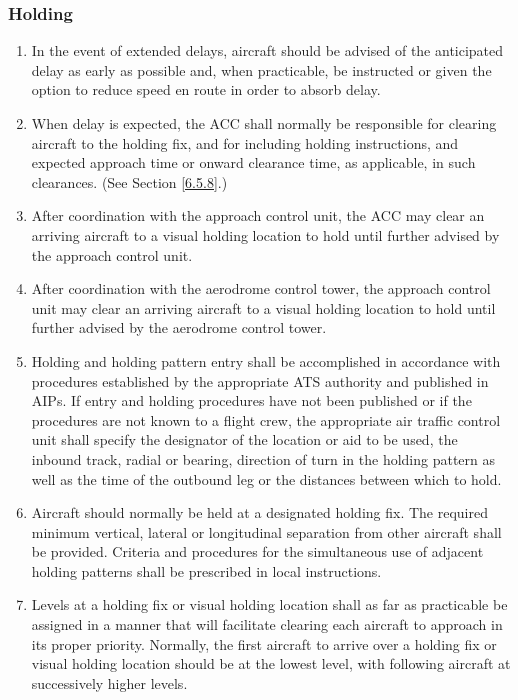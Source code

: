 \documentclass[../vATM.tex]{subfiles}
\begin{document}
    \subsubsection{Holding}

    \begin{enumerate}
        \item In the event of extended delays, aircraft should be advised of the anticipated delay as early as possible and, when practicable, be instructed or given the option to reduce speed en route in order to absorb delay.
        \item When delay is expected, the ACC shall normally be responsible for clearing aircraft to the holding fix, and for including holding instructions, and expected approach time or onward clearance time, as applicable, in such clearances. (See Section \ref{6.5.8}.)
        \item After coordination with the approach control unit, the ACC may clear an arriving aircraft to a visual holding location to hold until further advised by the approach control unit.
        \item After coordination with the aerodrome control tower, the approach control unit may clear an arriving aircraft to a visual holding location to hold until further advised by the aerodrome control tower.
        \item Holding and holding pattern entry shall be accomplished in accordance with procedures established by the appropriate ATS authority and published in AIPs. If entry and holding procedures have not been published or if the procedures are not known to a flight crew, the appropriate air traffic control unit shall specify the designator of the location or aid to be used, the inbound track, radial or bearing, direction of turn in the holding pattern as well as the time of the outbound leg or the distances between which to hold.
        \item Aircraft should normally be held at a designated holding fix. The required minimum vertical, lateral or longitudinal separation from other aircraft shall be provided. Criteria and procedures for the simultaneous use of adjacent holding patterns shall be prescribed in local instructions.
        \item Levels at a holding fix or visual holding location shall as far as practicable be assigned in a manner that will facilitate clearing each aircraft to approach in its proper priority. Normally, the first aircraft to arrive over a holding fix or visual holding location should be at the lowest level, with following aircraft at successively higher levels.

\end{enumerate}
\end{document}
